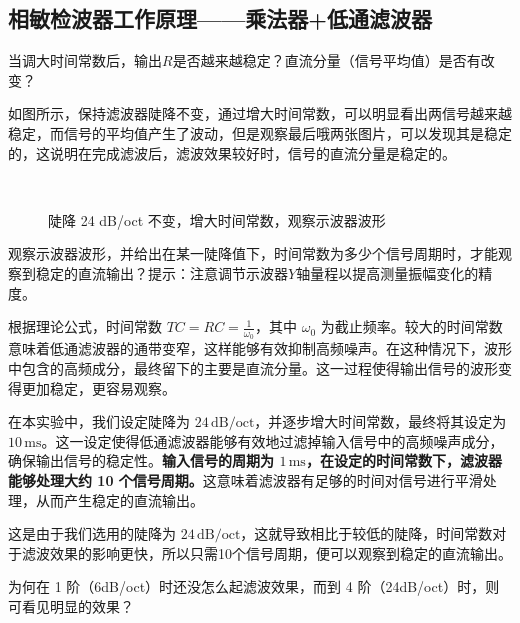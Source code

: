 \documentclass[dvipsnames, svgnames,a4paper,11pt]{article}
\begin{document}
\subsection{相敏检波器工作原理——乘法器+低通滤波器}
\begin{question}
	当调大时间常数后，输出$R$是否越来越稳定？直流分量（信号平均值）是否有改变？
\end{question}
如图所示，保持滤波器陡降不变，通过增大时间常数，可以明显看出两信号越来越稳定，而信号的平均值产生了波动，但是观察最后哦两张图片，可以发现其是稳定的，这说明在完成滤波后，滤波效果较好时，信号的直流分量是稳定的。
\begin{figure}[htbp]
	\centering
	\quad
	\quad
	\\

	\quad
	\quad
	\caption{陡降 24 dB/oct 不变，增大时间常数，观察示波器波形}
	\label{fig:time_constant_effect}
\end{figure}
\begin{question}
	观察示波器波形，并给出在某一陡降值下，时间常数为多少个信号周期时，才能观
察到稳定的直流输出？提示：注意调节示波器$Y$轴量程以提高测量振幅变化的精度。
\end{question}
根据理论公式，时间常数 \( TC = RC = \frac{1}{\omega_0} \)，其中 \( \omega_0 \) 为截止频率。较大的时间常数意味着低通滤波器的通带变窄，这样能够有效抑制高频噪声。在这种情况下，波形中包含的高频成分，最终留下的主要是直流分量。这一过程使得输出信号的波形变得更加稳定，更容易观察。

在本实验中，我们设定陡降为 \( 24 \, \text{dB/oct} \)，并逐步增大时间常数，最终将其设定为 \( 10 \, \text{ms} \)。这一设定使得低通滤波器能够有效地过滤掉输入信号中的高频噪声成分，确保输出信号的稳定性。\textbf{输入信号的周期为 \( 1 \, \text{ms} \)，在设定的时间常数下，滤波器能够处理大约 10 个信号周期。}这意味着滤波器有足够的时间对信号进行平滑处理，从而产生稳定的直流输出。

这是由于我们选用的陡降为 \( 24 \, \text{dB/oct} \)，这就导致相比于较低的陡降，时间常数对于滤波效果的影响更快，所以只需10个信号周期，便可以观察到稳定的直流输出。
\begin{question}
	为何在 1 阶（6dB/oct）时还没怎么起滤波效果，而到 4 阶（24dB/oct）时，则可看见明显的效果？
\end{question}
\end{document}
